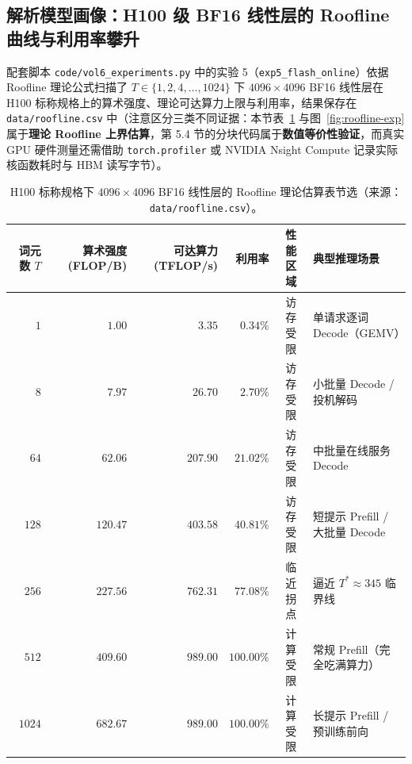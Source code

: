 \subsection{解析模型画像：H100 级 BF16 线性层的 Roofline 曲线与利用率攀升}

配套脚本 \texttt{code/vol6\_experiments.py} 中的实验 5（\texttt{exp5\_flash\_online}）依据 Roofline 理论公式扫描了 $T \in \{1, 2, 4, \dots, 1024\}$ 下 $4096 \times 4096$ BF16 线性层在 H100 标称规格上的算术强度、理论可达算力上限与利用率，结果保存在 \texttt{data/roofline.csv} 中（注意区分三类不同证据：本节表~\ref{tab:roofline-data} 与图~\ref{fig:roofline-exp} 属于\textbf{理论 Roofline 上界估算}，第 5.4 节的分块代码属于\textbf{数值等价性验证}，而真实 GPU 硬件测量还需借助 \texttt{torch.profiler} 或 NVIDIA Nsight Compute 记录实际核函数耗时与 HBM 读写字节）。

\begin{table}[htbp]
\centering
\caption{H100 标称规格下 $4096 \times 4096$ BF16 线性层的 Roofline 理论估算表节选（来源：\texttt{data/roofline.csv}）。}
\label{tab:roofline-data}
\footnotesize
\setlength{\tabcolsep}{4.2pt}
\begin{tabular}{@{}rrrrcl@{}}
\toprule
\textbf{词元数 $T$} & \textbf{算术强度 (FLOP/B)} & \textbf{可达算力 (TFLOP/s)} & \textbf{利用率} & \textbf{性能区域} & \textbf{典型推理场景} \\
\midrule
$1$ & $1.00$ & $3.35$ & $0.34\%$ & 访存受限 & 单请求逐词 Decode（GEMV） \\
$8$ & $7.97$ & $26.70$ & $2.70\%$ & 访存受限 & 小批量 Decode / 投机解码 \\
$64$ & $62.06$ & $207.90$ & $21.02\%$ & 访存受限 & 中批量在线服务 Decode \\
$128$ & $120.47$ & $403.58$ & $40.81\%$ & 访存受限 & 短提示 Prefill / 大批量 Decode \\
$256$ & $227.56$ & $762.31$ & $77.08\%$ & 临近拐点 & 逼近 $T^* \approx 345$ 临界线 \\
$512$ & $409.60$ & $989.00$ & $100.00\%$ & 计算受限 & 常规 Prefill（完全吃满算力） \\
$1024$ & $682.67$ & $989.00$ & $100.00\%$ & 计算受限 & 长提示 Prefill / 预训练前向 \\
\bottomrule
\end{tabular}
\end{table}

